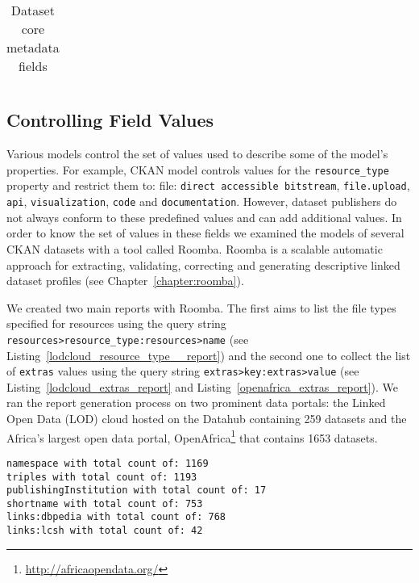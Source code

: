 \begin{center}
{\begin{longtable}[h]{|l|p{2cm}|p{9cm}|c|}
\caption[Dataset core metadata fields]{Dataset core metadata fields} \label{table:core_metadata_fields} \\

\end{longtable}
}
\end{center}

\subsection{Controlling Field Values}
Various models control the set of values used to describe some of the model's properties. For example, CKAN model controls values for the \texttt{resource\_type} property and restrict them to: file: \texttt{direct accessible bitstream}, \texttt{file.upload}, \texttt{api}, \texttt{visualization}, \texttt{code} and \texttt{documentation}. However, dataset publishers do not always conform to these predefined values and can add additional values. In order to know the set of values in these fields we examined the models of several CKAN datasets with a tool called Roomba. Roomba is a scalable automatic approach for extracting, validating, correcting and generating descriptive linked dataset profiles (see Chapter~\ref{chapter:roomba}).

We created two main reports with Roomba. The first aims to list the file types specified for resources using the query string \texttt{resources>resource\_type:resources>name} (see Listing~\ref{lodcloud_resource_type__report}) and the second one to collect the list of \texttt{extras} values using the query string \texttt{extras>key:extras>value} (see Listing~\ref{lodcloud_extras_report} and Listing~\ref{openafrica_extras_report}). We ran the report generation process on two prominent data portals: the Linked Open Data (LOD) cloud hosted on the Datahub containing 259 datasets and the Africa's largest open data portal, OpenAfrica\footnote{\url{http://africaopendata.org/}} that contains 1653 datasets.

\begin{lstlisting}
namespace with total count of: 1169
triples with total count of: 1193
publishingInstitution with total count of: 17
shortname with total count of: 753
links:dbpedia with total count of: 768
links:lcsh with total count of: 42
\end{lstlisting}

